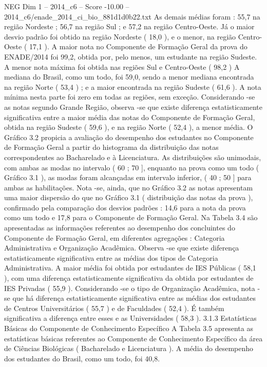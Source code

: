 \begin{textsample}{NEG Dim 1 – 2014\_c6 – Score -10.00 – 2014\_c6/enade\_2014\_ci\_bio\_881d1d0b22.txt}
As demais médias foram : 55,7 na região Nordeste ; 56,7 na região Sul ; e 57,2 na região Centro-Oeste.
Já o maior desvio padrão foi obtido na região Nordeste ( 18,0 ), e o menor, na região Centro-Oeste ( 17,1 ).
A maior nota no Componente de Formação Geral da prova do ENADE/2014 foi 99,2, obtida por, pelo menos, um estudante na região Sudeste.
A menor nota máxima foi obtida nas regiões Sul e Centro-Oeste ( 98,2 ) A mediana do Brasil, como um todo, foi 59,0, sendo a menor mediana encontrada na região Norte ( 53,4 ) ; e a maior encontrada na região Sudeste ( 61,6 ).
A nota mínima nesta parte foi zero em todas as regiões, sem exceção.
Considerando -se as notas segundo Grande Região, observa -se que existe diferença estatisticamente significativa entre a maior média das notas do Componente de Formação Geral, obtida na região Sudeste ( 59,6 ), e na região Norte ( 52,4 ), a menor média.
O Gráfico 3.2 propicia a avaliação do desempenho dos estudantes no Componente de Formação Geral a partir do histograma da distribuição das notas correspondentes ao Bacharelado e à Licenciatura.
As distribuições são unimodais, com ambas as modas no intervalo ( 60 ; 70 ], enquanto na prova como um todo ( Gráfico 3.1 ), as modas foram alcançadas em intervalo inferior, ( 40 ; 50 ] para ambas as habilitações.
Nota -se, ainda, que no Gráfico 3.2 as notas apresentam uma maior dispersão do que no Gráfico 3.1 ( distribuição das notas da prova ), confirmado pela comparação dos desvios padrões : 14,6 para a nota da prova como um todo e 17,8 para o Componente de Formação Geral.
Na Tabela 3.4 são apresentadas as informações referentes ao desempenho dos concluintes do Componente de Formação Geral, em diferentes agregações : Categoria Administrativa e Organização Acadêmica.
Observa -se que existe diferença estatisticamente significativa entre as médias dos tipos de Categoria Administrativa.
A maior média foi obtida por estudantes de IES Públicas ( 58,1 ), com uma diferença estatisticamente significativa da obtida por estudantes de IES Privadas ( 55,9 ).
Considerando -se o tipo de Organização Acadêmica, nota -se que há diferença estatisticamente significativa entre as médias dos estudantes de Centros Universitários ( 55,7 ) e de Faculdades ( 52,4 ).
É também significativa a diferença entre esses e as Universidades ( 58,3 ). 3.1.3 Estatísticas Básicas do Componente de Conhecimento Específico A Tabela 3.5 apresenta as estatísticas básicas referentes ao Componente de Conhecimento Específico da área de Ciências Biológicas ( Bacharelado e Licenciatura ).
A média do desempenho dos estudantes do Brasil, como um todo, foi 40,8.

\end{textsample}
